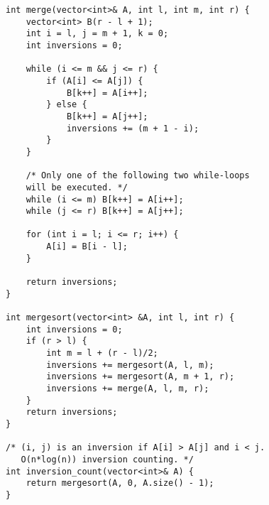 \begin{lstlisting}
int merge(vector<int>& A, int l, int m, int r) {
	vector<int> B(r - l + 1);
	int i = l, j = m + 1, k = 0;
	int inversions = 0;

	while (i <= m && j <= r) {
		if (A[i] <= A[j]) {
			B[k++] = A[i++];
		} else {
			B[k++] = A[j++];
			inversions += (m + 1 - i);
		}
	}

    /* Only one of the following two while-loops 
    will be executed. */
	while (i <= m) B[k++] = A[i++];
	while (j <= r) B[k++] = A[j++];

	for (int i = l; i <= r; i++) {
		A[i] = B[i - l];
	}

	return inversions;
}

int mergesort(vector<int> &A, int l, int r) {
	int inversions = 0;
	if (r > l) {
		int m = l + (r - l)/2;
		inversions += mergesort(A, l, m);
		inversions += mergesort(A, m + 1, r);
		inversions += merge(A, l, m, r);
	}
	return inversions;
}

/* (i, j) is an inversion if A[i] > A[j] and i < j.
   O(n*log(n)) inversion counting. */
int inversion_count(vector<int>& A) {
	return mergesort(A, 0, A.size() - 1);
}
\end{lstlisting}